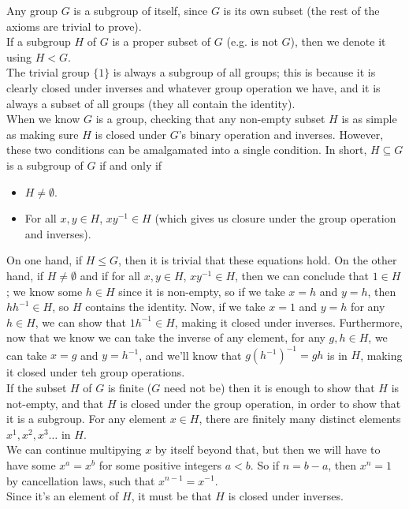 \documentclass[12pt]{article}
\begin{document}
    Any group $G$ is a subgroup of itself,
    since $G$ is its own subset
    (the rest of the axioms are trivial to prove). \\
    If a subgroup $H$ of $G$ is a proper subset of $G$
    (e.g. is not $G$),
    then we denote it using $H < G$. \\

    The trivial group $\{1\}$ is always a subgroup of all groups;
    this is because it is clearly closed under inverses and
    whatever group operation we have,
    and it is always a subset of all groups
    (they all contain the identity). \\

    When we know $G$ is a group,
    checking that any non-empty subset $H$ is as simple as making sure
    $H$ is closed under $G$'s binary operation and inverses.
    However, these two conditions can be amalgamated into a single
    condition.
    In short, $H \subseteq G$ is a subgroup of $G$
    if and only if
    \begin{itemize}[label=$\diamond$]
        \item
            $H \neq \emptyset$.
        \item
            For all $x, y \in H$, $xy^{-1} \in H$
            (which gives us closure under the group operation and inverses).
    \end{itemize}
    On one hand,
    if $H \leqslant G$, then it is trivial that these equations hold.
    On the other hand, if $H \neq \emptyset$
    and if for all $x, y \in H$, $xy^{-1} \in H$,
    then we can conclude that $1 \in H$;
    we know some $h \in H$ since it is non-empty,
    so if we take $x = h$ and $y = h$,
    then $hh^{-1} \in H$,
    so $H$ contains the identity.
    Now, if we take $x = 1$ and $y = h$ for any $h \in H$,
    we can show that $1h^{-1} \in H$,
    making it closed under inverses.
    Furthermore, now that we know we can take the inverse of any element,
    for any $g, h \in H$, we can take $x = g$ and $y = h^{-1}$,
    and we'll know that $g(h^{-1})^{-1} = gh$ is in $H$,
    making it closed under teh group operations. \\
    
    If the subset $H$ of $G$ is finite
    ($G$ need not be)
    then it is enough to show that $H$ is not-empty,
    and that $H$ is closed under the group operation,
    in order to show that it is a subgroup.
    For any element $x \in H$,
    there are finitely many distinct elements
    $x^1, x^2, x^3 \dots$ in $H$. \\
    We can continue multipying $x$ by itself beyond that,
    but then we will have to have some $x^a = x^b$
    for some positive integers $a < b$.
    So if $n = b-a$,
    then $x^n = 1$ by cancellation laws,
    such that $x^{n-1} = x^{-1}$. \\
    Since it's an element of $H$,
    it must be that $H$ is closed under inverses. \\
\end{document}
